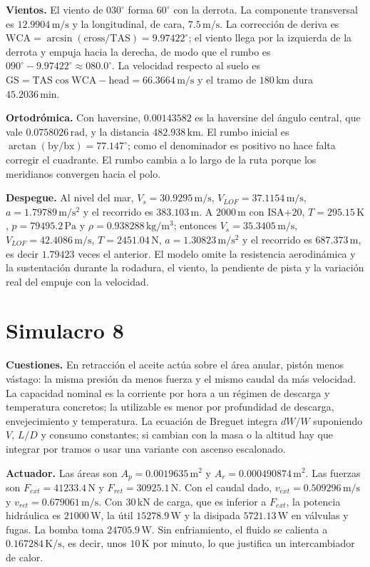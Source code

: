 \textbf{Vientos.} El viento de $030^\circ$ forma $60^\circ$ con la derrota. La componente transversal es $12.9904\,\mathrm{m/s}$ y la longitudinal, de cara, $7.5\,\mathrm{m/s}$. La corrección de deriva es $\mathrm{WCA}=\arcsin(\mathrm{cross}/\mathrm{TAS})=9.97422^\circ$; el viento llega por la izquierda de la derrota y empuja hacia la derecha, de modo que el rumbo es $090^\circ-9.97422^\circ\approx080.0^\circ$. La velocidad respecto al suelo es $\mathrm{GS}=\mathrm{TAS}\cos\mathrm{WCA}-\mathrm{head}=66.3664\,\mathrm{m/s}$ y el tramo de $180\,\mathrm{km}$ dura $45.2036\,\mathrm{min}$.

\textbf{Ortodrómica.} Con haversine, $0.00143582$ es la haversine del ángulo central, que vale $0.0758026\,\mathrm{rad}$, y la distancia $482.938\,\mathrm{km}$. El rumbo inicial es $\arctan(\mathrm{by}/\mathrm{bx})=77.147^\circ$; como el denominador es positivo no hace falta corregir el cuadrante. El rumbo cambia a lo largo de la ruta porque los meridianos convergen hacia el polo.

\textbf{Despegue.} Al nivel del mar, $V_s=30.9295\,\mathrm{m/s}$, $V_{LOF}=37.1154\,\mathrm{m/s}$, $a=1.79789\,\mathrm{m/s^2}$ y el recorrido es $383.103\,\mathrm m$. A $2000\,\mathrm m$ con ISA$+20$, $T=295.15\,\mathrm K$, $p=79495.2\,\mathrm{Pa}$ y $\rho=0.938288\,\mathrm{kg/m^3}$; entonces $V_s=35.3405\,\mathrm{m/s}$, $V_{LOF}=42.4086\,\mathrm{m/s}$, $T=2451.04\,\mathrm N$, $a=1.30823\,\mathrm{m/s^2}$ y el recorrido es $687.373\,\mathrm m$, es decir $1.79423$ veces el anterior. El modelo omite la resistencia aerodinámica y la sustentación durante la rodadura, el viento, la pendiente de pista y la variación real del empuje con la velocidad.



\section{Simulacro 8}
\textbf{Cuestiones.} En retracción el aceite actúa sobre el área anular, pistón menos vástago: la misma presión da menos fuerza y el mismo caudal da más velocidad. La capacidad nominal es la corriente por hora a un régimen de descarga y temperatura concretos; la utilizable es menor por profundidad de descarga, envejecimiento y temperatura. La ecuación de Breguet integra $dW/W$ suponiendo $V$, $L/D$ y consumo constantes; si cambian con la masa o la altitud hay que integrar por tramos o usar una variante con ascenso escalonado.

\textbf{Actuador.} Las áreas son $A_p=0.0019635\,\mathrm{m^2}$ y $A_r=0.000490874\,\mathrm{m^2}$. Las fuerzas son $F_{ext}=41233.4\,\mathrm N$ y $F_{ret}=30925.1\,\mathrm N$. Con el caudal dado, $v_{ext}=0.509296\,\mathrm{m/s}$ y $v_{ret}=0.679061\,\mathrm{m/s}$. Con $30\,\mathrm{kN}$ de carga, que es inferior a $F_{ext}$, la potencia hidráulica es $21000\,\mathrm W$, la útil $15278.9\,\mathrm W$ y la disipada $5721.13\,\mathrm W$ en válvulas y fugas. La bomba toma $24705.9\,\mathrm W$. Sin enfriamiento, el fluido se calienta a $0.167284\,\mathrm{K/s}$, es decir, unos $10\,\mathrm K$ por minuto, lo que justifica un intercambiador de calor.

